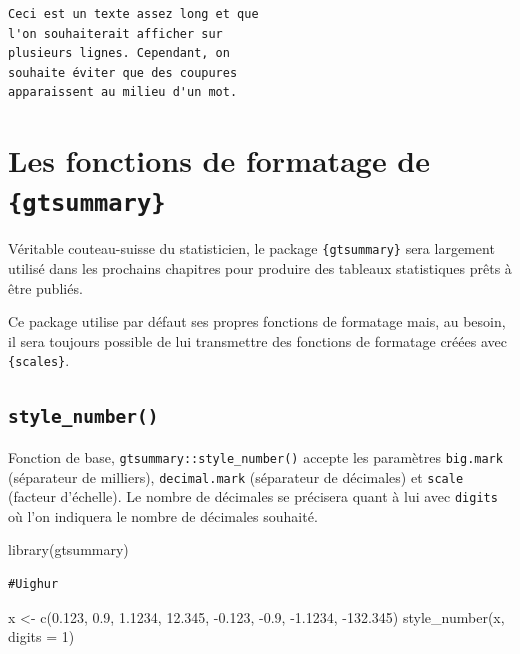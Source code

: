\documentclass[
  letterpaper,
  DIV=11,
  numbers=noendperiod,
  oneside]{scrreprt}
\newenvironment{Shaded}{\begin{snugshade}}{\end{snugshade}}
\newcommand{\AttributeTok}[1]{\textcolor[rgb]{0.40,0.45,0.13}{#1}}
\newcommand{\DecValTok}[1]{\textcolor[rgb]{0.68,0.00,0.00}{#1}}
\newcommand{\FloatTok}[1]{\textcolor[rgb]{0.68,0.00,0.00}{#1}}
\newcommand{\FunctionTok}[1]{\textcolor[rgb]{0.28,0.35,0.67}{#1}}
\newcommand{\NormalTok}[1]{\textcolor[rgb]{0.00,0.23,0.31}{#1}}
\newcommand{\OtherTok}[1]{\textcolor[rgb]{0.00,0.23,0.31}{#1}}
\newcommand{\SpecialCharTok}[1]{\textcolor[rgb]{0.37,0.37,0.37}{#1}}
\begin{document}
\begin{verbatim}
Ceci est un texte assez long et que
l'on souhaiterait afficher sur
plusieurs lignes. Cependant, on
souhaite éviter que des coupures
apparaissent au milieu d'un mot.
\end{verbatim}

\hypertarget{les-fonctions-de-formatage-de-gtsummary}{%
\section{\texorpdfstring{Les fonctions de formatage de
\texttt{\{gtsummary\}}}{Les fonctions de formatage de \{gtsummary\}}}\label{les-fonctions-de-formatage-de-gtsummary}}

Véritable couteau-suisse du statisticien, le package
\texttt{\{gtsummary\}} sera largement utilisé dans les prochains
chapitres pour produire des tableaux statistiques prêts à être publiés.

Ce package utilise par défaut ses propres fonctions de formatage mais,
au besoin, il sera toujours possible de lui transmettre des fonctions de
formatage créées avec \texttt{\{scales\}}.

\hypertarget{style_number}{%
\subsection{\texorpdfstring{\texttt{style\_number()}}{style\_number()}}\label{style_number}}

Fonction de base, \texttt{gtsummary::style\_number()} accepte les
paramètres \texttt{big.mark} (séparateur de milliers),
\texttt{decimal.mark} (séparateur de décimales) et \texttt{scale}
(facteur d'échelle). Le nombre de décimales se précisera quant à lui
avec \texttt{digits} où l'on indiquera le nombre de décimales souhaité.

\begin{Shaded}
\begin{Highlighting}[]
\FunctionTok{library}\NormalTok{(gtsummary)}
\end{Highlighting}
\end{Shaded}

\begin{verbatim}
#Uighur
\end{verbatim}

\begin{Shaded}
\begin{Highlighting}[]
\NormalTok{x }\OtherTok{\textless{}{-}} \FunctionTok{c}\NormalTok{(}\FloatTok{0.123}\NormalTok{, }\FloatTok{0.9}\NormalTok{, }\FloatTok{1.1234}\NormalTok{, }\FloatTok{12.345}\NormalTok{, }\SpecialCharTok{{-}}\FloatTok{0.123}\NormalTok{, }\SpecialCharTok{{-}}\FloatTok{0.9}\NormalTok{, }\SpecialCharTok{{-}}\FloatTok{1.1234}\NormalTok{, }\SpecialCharTok{{-}}\FloatTok{132.345}\NormalTok{)}
\FunctionTok{style\_number}\NormalTok{(x, }\AttributeTok{digits =} \DecValTok{1}\NormalTok{)}
\end{Highlighting}
\end{Shaded}
\end{document}
